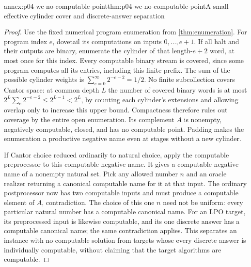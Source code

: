 \begin{annexitem}{annex:p04-wc-no-computable-point}{thm:p04-wc-no-computable-point}{A small effective cylinder cover and discrete-answer separation}
\begin{proof}
Use the fixed numerical program enumeration from \cref{thm:enumeration}.
For program index \(e\), dovetail its computations on inputs
\(0,\ldots,e+1\). If all halt and their outputs are binary, enumerate
the cylinder of that length-\(e+2\) word, at most once for this index.
Every computable binary stream is covered, since some program computes
all its entries, including this finite prefix.
The sum of the possible cylinder weights is
\(\sum_{e=0}^{\infty}2^{-e-2}=1/2\).
No finite subcollection covers Cantor space: at common depth \(L\)
the number of covered binary words is at most
\(2^L\sum_e2^{-e-2}\leq2^{L-1}<2^L\), by counting each cylinder's
extensions and allowing overlap only to increase this upper bound.
Compactness therefore rules out coverage by the entire open enumeration.
Its complement \(A\) is nonempty, negatively computable, closed, and
has no computable point. Padding makes the enumeration a productive
negative name even at stages without a new cylinder.

If Cantor choice reduced ordinarily to natural choice, apply the
computable preprocessor to this computable negative name. It gives
a computable negative name of a nonempty natural set. Pick any allowed
number \(n\) and an oracle realizer returning a canonical computable
name for it at that input. The ordinary postprocessor now has two
computable inputs and must produce a computable element of \(A\),
contradiction. The choice of this one \(n\) need not be uniform:
every particular natural number has a computable canonical name.
For an LPO target, its preprocessed input is likewise computable,
and its one discrete answer has a computable canonical name; the same
contradiction applies. This separates an instance with no computable
solution from targets whose every discrete answer is individually
computable, without claiming that the target algorithms are computable.
\end{proof}
\end{annexitem}

